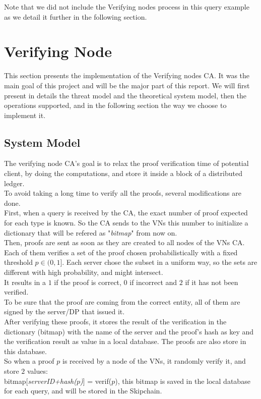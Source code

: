 \documentclass{article}
\begin{document}
Note that we did not include the Verifying nodes process in this query example as we detail it further in the following section.

\section{Verifying  Node}
This section presents the implementation of the Verifying nodes CA. It was the main goal of this project and will be the major part of this report. We will first present in details the threat model and the theoretical system model, then the operations supported, and in the following section the way we choose to implement it.\\
\subsection{System Model}
The verifying node CA's goal is to relax the proof verification time of potential client, by doing the computations, and store it inside a block of a distributed ledger.\\
To avoid taking a long time to verify all the proofs, several modifications are done.\\
First, when a query is received by the CA, the exact number of proof expected for each type is known. So the CA sends to the VNs this number to initialize a dictionary that will be refered as "\textit{bitmap}" from now on.\\
Then, proofs are sent as soon as they are created to all nodes of the VNs CA. Each of them verifies a set of the proof chosen probabilistically with a fixed threshold $p \in (0,1]$. Each server chose the subset in a uniform way, so the sets are different with high probability, and might intersect.\\
It results in a $1$ if the proof is correct, $0$ if incorrect and $2$ if it has not been verified.\\
To be sure that the proof are coming from the correct entity, all of them are signed by the server/DP that issued it.\\
After verifying these proofs, it stores the result of the verification in the dictionary (bitmap) with the name of the server and the proof's hash as key and the verification result as value in a local database. The proofs are also store in this database.\\
So when a proof $p$ is received by a node of the VNs, it randomly verify it, and store $2$ values:\\
bitmap[\textit{serverID+hash($p$)}] = verif($p$), this bitmap is saved in the local database for each query, and will be stored in the Skipchain.\\
\end{document}
